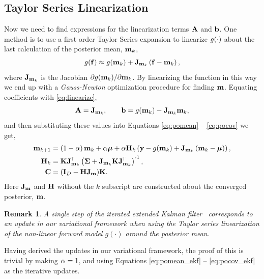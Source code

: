 \documentclass{article} %
\newtheorem{remark}{Remark}
\begin{document}
\subsection{Taylor Series Linearization}

Now we need to find expressions for the linearization terms $\mathbf{A}$ and
$\mathbf{b}$. One method is to use a first order Taylor Series expansion to 
linearize $g\!\left({{\cdot}}\right)$ about the last calculation of the posterior mean, 
$\mathbf{m}_k$,
\begin{equation}
    g\!\left({{\mathbf{f}}}\right) \approx g\!\left({{\mathbf{m}_k}}\right) +
    \mathbf{J}_{\mathbf{m}_k}\left({\mathbf{f} - \mathbf{m}_k}\right),
\end{equation}
where $\mathbf{J}_{\mathbf{m}_k}$ is the Jacobian $\partial g\!\left({{\mathbf{m}_k}}\right)\!/
\partial\mathbf{m}_k$. By linearizing the function in this way we end up with a
\emph{Gauss-Newton} optimization procedure for finding $\mathbf{m}$. Equating
coefficients with \eqref{eq:linearize}, 
\begin{equation}
    \mathbf{A} = \mathbf{J}_{\mathbf{m}_k}, \qquad \mathbf{b} = g\!\left({{\mathbf{m}_k}}\right) -
    \mathbf{J}_{\mathbf{m}_k}\mathbf{m}_k,
\end{equation}
and then substituting these values into Equations
\eqref{eq:pomean} -- \eqref{eq:pocov} we get,
\begin{align}
    \mathbf{m}_{k+1} &= \left({1-\alpha}\right)\mathbf{m}_k + \alpha\boldsymbol{\mu} 
        + \alpha\mathbf{H}_k\left({\mathbf{y} - g\!\left({{\mathbf{m}_k}}\right) 
        + \mathbf{J}_{\mathbf{m}_k}\left({\mathbf{m}_k - \boldsymbol{\mu}}\right)}\right),
    \label{eq:pomean_ekf} \\
    \mathbf{H}_k &= \mathbf{K}\mathbf{J}_{\mathbf{m}_k}^{\!\top}\left({\boldsymbol{\Sigma} +
        \mathbf{J}_{\mathbf{m}_k}\mathbf{K}\mathbf{J}_{\mathbf{m}_k}^{\!\top}}\right)^{\text{-}1}, \\
    \mathbf{C} &= \left({\mathbf{I}_{D} - \mathbf{H}\mathbf{J}_{\mathbf{m}}}\right)\!\mathbf{K}.
    \label{eq:pocov_ekf}
\end{align}
Here $\mathbf{J}_{\mathbf{m}}$ and $\mathbf{H}$ without the $k$ subscript are constructed
about the converged posterior, $\mathbf{m}$. 
%
\begin{remark}
A single step of the  iterated extended Kalman filter~\cite{Bell1993,
    Sibley2006} corresponds to an update  in our variational framework when
using the Taylor series linearization of the non-linear forward model
$g(\cdot)$ around the posterior mean.
\end{remark}
Having derived the updates in our variational framework, the proof of this is
trivial by making  $\alpha =1$, and using Equations \eqref{eq:pomean_ekf} --
\eqref{eq:pocov_ekf} as the iterative updates.
\end{document}
